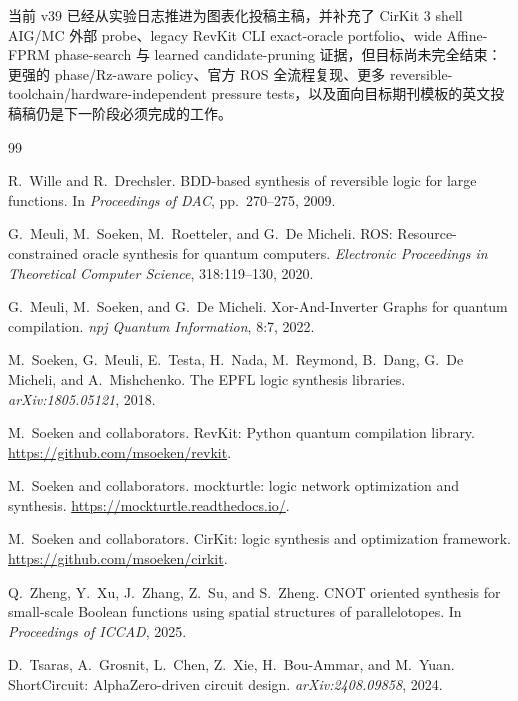 \documentclass[UTF8,fontset=macnew,11pt]{ctexart}
\begin{document}
当前 v39 已经从实验日志推进为图表化投稿主稿，并补充了 CirKit 3 shell AIG/MC 外部 probe、legacy RevKit CLI exact-oracle portfolio、wide Affine-FPRM phase-search 与 learned candidate-pruning 证据，但目标尚未完全结束：更强的 phase/Rz-aware policy、官方 ROS 全流程复现、更多 reversible-toolchain/hardware-independent pressure tests，以及面向目标期刊模板的英文投稿稿仍是下一阶段必须完成的工作。

\begin{thebibliography}{99}

R.~Wille and R.~Drechsler.
\newblock BDD-based synthesis of reversible logic for large functions.
\newblock In \emph{Proceedings of DAC}, pp.~270--275, 2009.

G.~Meuli, M.~Soeken, M.~Roetteler, and G.~De Micheli.
\newblock ROS: Resource-constrained oracle synthesis for quantum computers.
\newblock \emph{Electronic Proceedings in Theoretical Computer Science}, 318:119--130, 2020.

G.~Meuli, M.~Soeken, and G.~De Micheli.
\newblock Xor-And-Inverter Graphs for quantum compilation.
\newblock \emph{npj Quantum Information}, 8:7, 2022.

M.~Soeken, G.~Meuli, E.~Testa, H.~Nada, M.~Reymond, B.~Dang, G.~De Micheli, and A.~Mishchenko.
\newblock The EPFL logic synthesis libraries.
\newblock \emph{arXiv:1805.05121}, 2018.

M.~Soeken and collaborators.
\newblock RevKit: Python quantum compilation library.
\newblock \url{https://github.com/msoeken/revkit}.

M.~Soeken and collaborators.
\newblock mockturtle: logic network optimization and synthesis.
\newblock \url{https://mockturtle.readthedocs.io/}.

M.~Soeken and collaborators.
\newblock CirKit: logic synthesis and optimization framework.
\newblock \url{https://github.com/msoeken/cirkit}.

Q.~Zheng, Y.~Xu, J.~Zhang, Z.~Su, and S.~Zheng.
\newblock CNOT oriented synthesis for small-scale Boolean functions using spatial structures of parallelotopes.
\newblock In \emph{Proceedings of ICCAD}, 2025.

D.~Tsaras, A.~Grosnit, L.~Chen, Z.~Xie, H.~Bou-Ammar, and M.~Yuan.
\newblock ShortCircuit: AlphaZero-driven circuit design.
\newblock \emph{arXiv:2408.09858}, 2024.


\end{thebibliography}
\end{document}
